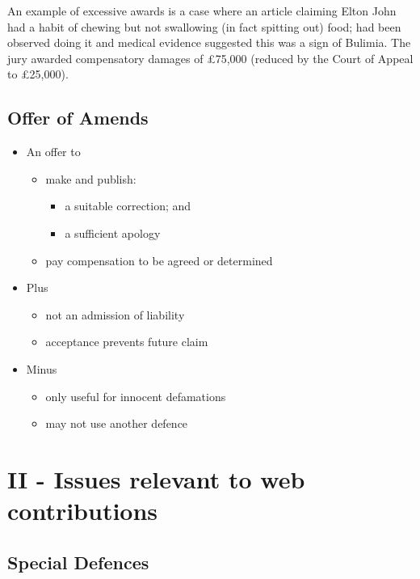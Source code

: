 \documentclass[]{article}
\begin{document}
An example of excessive awards is a case where an article claiming Elton
John had a habit of chewing but not swallowing (in fact spitting out)
food; had been observed doing it and medical evidence suggested this was
a sign of Bulimia. The jury awarded compensatory damages of £75,000
(reduced by the Court of Appeal to £25,000).

\subsection{Offer of Amends}

\begin{itemize}
\item
  An offer to

  \begin{itemize}
  \item
    make and publish:

    \begin{itemize}
    \item
      a suitable correction; and
    \item
      a sufficient apology
    \end{itemize}
  \item
    pay compensation to be agreed or determined
  \end{itemize}
\item
  Plus

  \begin{itemize}
  \item
    not an admission of liability
  \item
    acceptance prevents future claim
  \end{itemize}
\item
  Minus

  \begin{itemize}
  \item
    only useful for innocent defamations
  \item
    may not use another defence
  \end{itemize}
\end{itemize}

\section{II - Issues relevant to web contributions}

\subsection{Special Defences}
\end{document}
